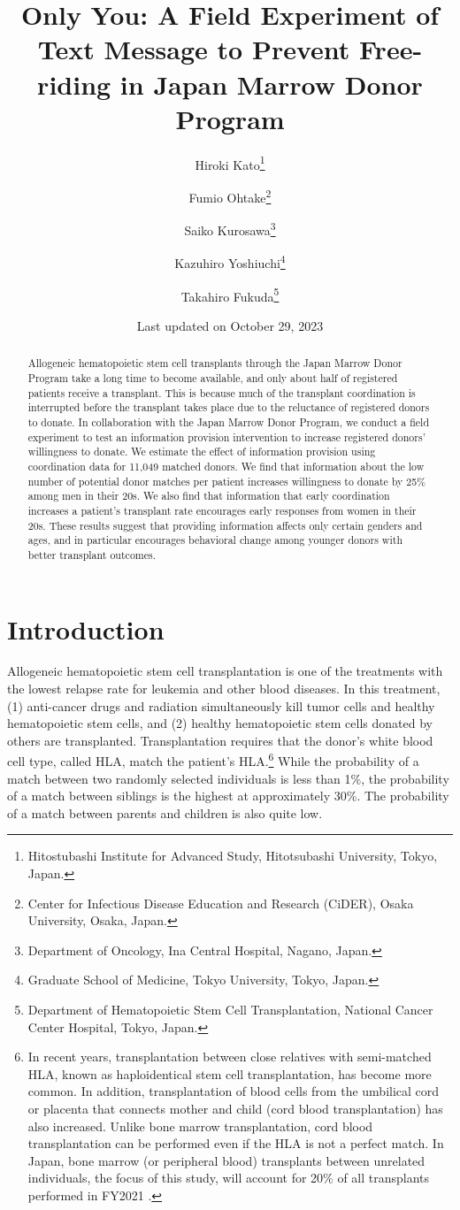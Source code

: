 \documentclass[
]{article}
\title{Only You:
A Field Experiment of Text Message to Prevent Free-riding in Japan Marrow Donor Program}
\author{Hiroki Kato\footnote{Hitostubashi Institute for Advanced Study, Hitotsubashi University, Tokyo, Japan.} \and Fumio Ohtake\footnote{Center for Infectious Disease Education and Research (CiDER), Osaka University, Osaka, Japan.} \and Saiko Kurosawa\footnote{Department of Oncology, Ina Central Hospital, Nagano, Japan.} \and Kazuhiro Yoshiuchi\footnote{Graduate School of Medicine, Tokyo University, Tokyo, Japan.} \and Takahiro Fukuda\footnote{Department of Hematopoietic Stem Cell Transplantation, National Cancer Center Hospital, Tokyo, Japan.}}
\date{Last updated on October 29, 2023}
\begin{document}
\maketitle
\begin{abstract}
Allogeneic hematopoietic stem cell transplants through the Japan Marrow Donor Program take a long time to become available, and only about half of registered patients receive a transplant. This is because much of the transplant coordination is interrupted before the transplant takes place due to the reluctance of registered donors to donate. In collaboration with the Japan Marrow Donor Program, we conduct a field experiment to test an information provision intervention to increase registered donors' willingness to donate. We estimate the effect of information provision using coordination data for 11,049 matched donors. We find that information about the low number of potential donor matches per patient increases willingness to donate by 25\% among men in their 20s. We also find that information that early coordination increases a patient's transplant rate encourages early responses from women in their 20s. These results suggest that providing information affects only certain genders and ages, and in particular encourages behavioral change among younger donors with better transplant outcomes.
\end{abstract}

\hypertarget{intro}{%
\section{Introduction}\label{intro}}

Allogeneic hematopoietic stem cell transplantation is one of the treatments with the lowest relapse rate for leukemia and other blood diseases. In this treatment, (1) anti-cancer drugs and radiation simultaneously kill tumor cells and healthy hematopoietic stem cells, and (2) healthy hematopoietic stem cells donated by others are transplanted. Transplantation requires that the donor's white blood cell type, called HLA, match the patient's HLA.\footnote{In recent years, transplantation between close relatives with semi-matched HLA, known as haploidentical stem cell transplantation, has become more common. In addition, transplantation of blood cells from the umbilical cord or placenta that connects mother and child (cord blood transplantation) has also increased. Unlike bone marrow transplantation, cord blood transplantation can be performed even if the HLA is not a perfect match. In Japan, bone marrow (or peripheral blood) transplants between unrelated individuals, the focus of this study, will account for 20\% of all transplants performed in FY2021 \citep{JapaneseDataCenterf2022}.} While the probability of a match between two randomly selected individuals is less than 1\%, the probability of a match between siblings is the highest at approximately 30\%. The probability of a match between parents and children is also quite low.
\end{document}
